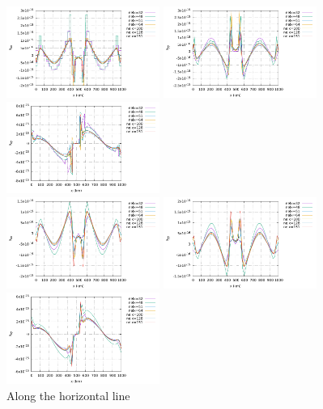 \begin{center}
\includegraphics[width=5cm]{python_codes/fieldstone_26/results/case1b/horizontal_exx.pdf}
\includegraphics[width=5cm]{python_codes/fieldstone_26/results/case1b/horizontal_eyy.pdf}
\includegraphics[width=5cm]{python_codes/fieldstone_26/results/case1b/horizontal_exy.pdf}\\
\includegraphics[width=5cm]{python_codes/fieldstone_26/results/case1b/horizontal_exxn.pdf}
\includegraphics[width=5cm]{python_codes/fieldstone_26/results/case1b/horizontal_eyyn.pdf}
\includegraphics[width=5cm]{python_codes/fieldstone_26/results/case1b/horizontal_exyn.pdf}\\
{\captionfont Along the horizontal line}
\end{center}

